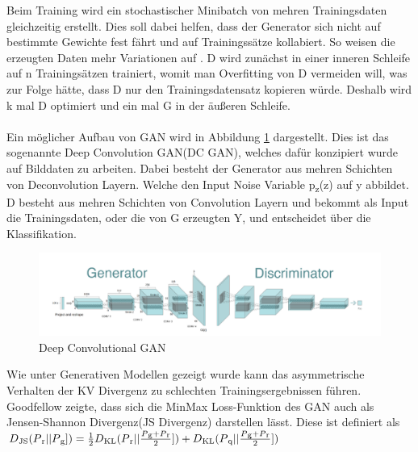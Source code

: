 \documentclass{llncs}
\begin{document}
Beim Training wird ein stochastischer Minibatch von mehren Trainingsdaten gleichzeitig erstellt. Dies soll dabei helfen, dass der Generator sich nicht auf bestimmte Gewichte fest fährt und auf Trainingssätze kollabiert. So weisen die erzeugten Daten mehr Variationen auf \cite{improvingan}. D wird zunächst in einer inneren Schleife auf n Trainingsätzen trainiert, womit man Overfitting von D vermeiden will, was zur Folge hätte, dass D nur den Trainingsdatensatz kopieren würde. Deshalb wird k mal D optimiert und ein mal G in der äußeren Schleife. 
\\\\
Ein möglicher Aufbau von GAN wird in Abbildung \ref{fig:Bild21} dargestellt. Dies ist das sogenannte Deep Convolution GAN(DC GAN), welches dafür konzipiert wurde auf Bilddaten zu arbeiten. Dabei besteht der Generator aus mehren Schichten von Deconvolution Layern. Welche den Input Noise Variable p\textsubscript{z}(z) auf y abbildet. D besteht aus mehren Schichten von Convolution Layern und bekommt als Input die Trainingsdaten, oder die von G erzeugten Y, und entscheidet über die Klassifikation\cite{dcgan}.

\begin{figure}[htbp] 
	\centering
	\includegraphics[width=1.0\textwidth]{dcgan1.png}
	\caption{Deep Convolutional GAN}
	\label{fig:Bild21}
\end{figure}

Wie unter Generativen Modellen gezeigt wurde kann das asymmetrische Verhalten der KV Divergenz zu schlechten Trainingsergebnissen führen. Goodfellow \cite{goodfellow2014} zeigte, dass sich die MinMax Loss-Funktion des GAN auch als Jensen-Shannon Divergenz(JS Divergenz) darstellen lässt. Diese ist definiert als\\

\begin{math} D\textsubscript{JS}(P\textsubscript{r}|| P\textsubscript{g}])=\frac{1}{2}D\textsubscript{KL}(P\textsubscript{r}|| \frac{P\textsubscript{g}+P\textsubscript{r}}{2}])+D\textsubscript{KL}(P\textsubscript{q}|| \frac{P\textsubscript{g}+P\textsubscript{r}}{2}])  
\end{math}
\\
\end{document}
